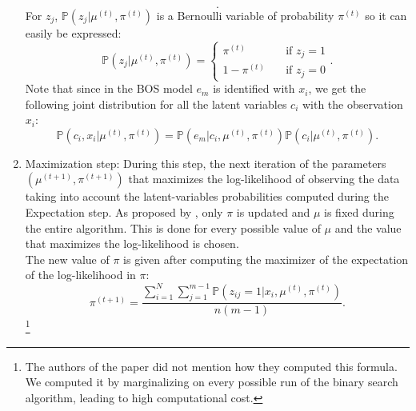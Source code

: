 \documentclass[a4paper,12pt]{article}
\newcommand{\tm}[1]{\todo[inline,color=orange!40]{{\textbf{TM:}~}#1}}
\newcommand{\ar}[1]{\todo[inline,color=green!40]{{\textbf{AR:}~}#1}}
\begin{document}
\begin{enumerate}
\begin{equation}
    .\end{equation}
    For $z_j$, $\mathbb{P}(z_j| \mu^{(t)}, \pi^{(t)})$ is a Bernoulli variable of probability $\pi^{(t)}$ so it can easily be expressed:
    \begin{equation}
    \mathbb{P}(z_j| \mu^{(t)}, \pi^{(t)}) = \begin{cases}
        \pi^{(t)}\quad &\text{if } z_j = 1\\
        1 - \pi^{(t)}\quad &\text{if } z_j = 0
        \end{cases}
    .\end{equation}
    Note that since in the BOS model $e_m$ is identified with $x_i$, we get the following joint distribution for all the latent variables $c_i$ with the observation $x_i$: 
    \begin{equation}
       \mathbb{P}(c_i,x_i| \mu^{(t)}, \pi^{(t)}) = \mathbb{P}(e_m|c_i, \mu^{(t)}, \pi^{(t)})\mathbb{P}(c_i| \mu^{(t)}, \pi^{(t)})
    .\end{equation}
    \item Maximization step: During this step, the next iteration of the parameters $(\mu^{(t+1)}, \pi^{(t+1)})$ that maximizes the log-likelihood of observing the data taking into account the latent-variables probabilities computed during the Expectation step. As proposed by \citet{biernacki2016model}, only $\pi$ is updated and $\mu$ is fixed during the entire algorithm. This is done for every possible value of $\mu$ and the value that maximizes the log-likelihood is chosen. \\
    The new value of $\pi$ is given after computing the maximizer of the expectation of the log-likelihood in $\pi$:
    \begin{equation}
    \pi^{(t+1)} = \frac{\sum_{i=1}^N \sum_{j=1}^{m-1} \mathbb{P}(z_{ij}=1|x_i, \mu^{(t)}, \pi^{(t)})}{n(m-1)}
    .\end{equation}
    \footnote{The authors of the paper did not mention how they computed this formula. We computed it by marginalizing on every possible run of the binary search algorithm, leading to high computational cost.

}
\end{enumerate}
\end{document}
